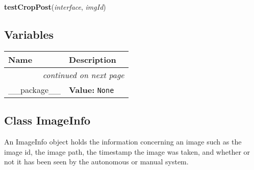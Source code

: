     \label{client_rest:testCropPost}

    \vspace{0.5ex}

\hspace{.8\funcindent}\begin{boxedminipage}{\funcwidth}

    \raggedright \textbf{testCropPost}(\textit{interface}, \textit{imgId})

\setlength{\parskip}{2ex}
\setlength{\parskip}{1ex}
    \end{boxedminipage}



  \subsection{Variables}

    \vspace{-1cm}
\hspace{\varindent}\begin{longtable}{|p{\varnamewidth}|p{\vardescrwidth}|l}
\cline{1-2}
\cline{1-2} \centering \textbf{Name} & \centering \textbf{Description}& \\
\cline{1-2}
\endhead\cline{1-2}\multicolumn{3}{r}{\small\textit{continued on next page}}\\\endfoot\cline{1-2}
\endlastfoot\raggedright \_\-\_\-p\-a\-c\-k\-a\-g\-e\-\_\-\_\- & \raggedright \textbf{Value:} 
{\tt None}&\\
\cline{1-2}
\end{longtable}



\subsection{Class ImageInfo}

    \label{client_rest:ImageInfo}
An ImageInfo object holds the information concerning an image such as the 
image id, the image path, the timestamp the image was taken, and whether or
not it has been seen by the autonomous or manual system.


